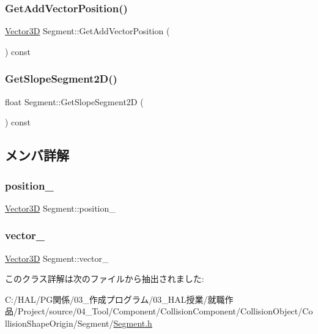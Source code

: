 \subsubsection{\texorpdfstring{Get\+Add\+Vector\+Position()}{GetAddVectorPosition()}}
{\footnotesize\ttfamily \mbox{\hyperlink{class_vector3_d}{Vector3D}} Segment\+::\+Get\+Add\+Vector\+Position (\begin{DoxyParamCaption}{ }\end{DoxyParamCaption}) const\hspace{0.3cm}{\ttfamily [inline]}}

\mbox{\label{class_segment_a889d62f6d4c10701464726da706ae043}} 
\subsubsection{\texorpdfstring{Get\+Slope\+Segment2\+D()}{GetSlopeSegment2D()}}
{\footnotesize\ttfamily float Segment\+::\+Get\+Slope\+Segment2D (\begin{DoxyParamCaption}{ }\end{DoxyParamCaption}) const\hspace{0.3cm}{\ttfamily [inline]}}



\subsection{メンバ詳解}
\mbox{\label{class_segment_aee447b161d940d22e9aa222091789e08}} 
\subsubsection{\texorpdfstring{position\+\_\+}{position\_}}
{\footnotesize\ttfamily \mbox{\hyperlink{class_vector3_d}{Vector3D}} Segment\+::position\+\_\+}

\mbox{\label{class_segment_a6834b88ecae688f0fc5b4ed95fab824b}} 
\subsubsection{\texorpdfstring{vector\+\_\+}{vector\_}}
{\footnotesize\ttfamily \mbox{\hyperlink{class_vector3_d}{Vector3D}} Segment\+::vector\+\_\+}



このクラス詳解は次のファイルから抽出されました\+:\begin{DoxyCompactItemize}
\item 
C\+:/\+H\+A\+L/\+P\+G関係/03\+\_\+作成プログラム/03\+\_\+\+H\+A\+L授業/就職作品/\+Project/source/04\+\_\+\+Tool/\+Component/\+Collision\+Component/\+Collision\+Object/\+Collision\+Shape\+Origin/\+Segment/\mbox{\hyperlink{_segment_8h}{Segment.\+h}}\end{DoxyCompactItemize}
